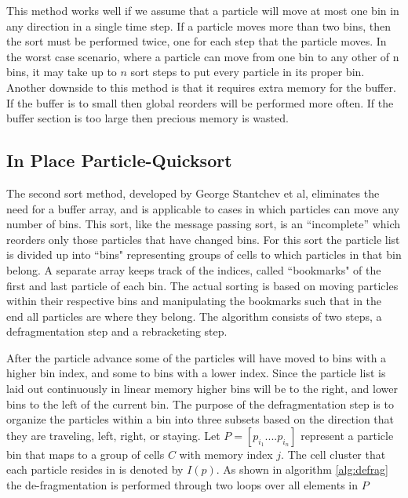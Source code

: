 	This method works well if we assume that a particle will move at most one bin in any direction in a single time step. If a particle moves more than two bins, then the sort must be performed twice, one for each step that the particle moves. In the worst case scenario, where a particle can move from one bin to any other of n bins, it may take up to $n$ sort steps to put every particle in its proper bin. Another downside to this method is that it requires extra memory for the buffer. If the buffer is to small then global reorders will be performed more often. If the buffer section is too large then precious memory is wasted. 

	\subsection{In Place Particle-Quicksort}
	The second sort method, developed by George Stantchev et al, eliminates the need for a buffer array, and is applicable to cases in which particles can move any number of bins. This sort, like the message passing sort, is an ``incomplete'' which reorders only those particles that have changed bins. For this sort the particle list is divided up into ``bins" representing groups of cells to which particles in that bin belong. A separate array keeps track of the indices, called ``bookmarks" of the first and last particle of each bin. The actual sorting is based on moving particles within their respective bins and manipulating the bookmarks such that in the end all particles are where they belong. The algorithm consists of two steps, a defragmentation step and a rebracketing step. 
	
	After the particle advance some of the particles will have moved to bins with a higher bin index, and some to bins with a lower index. Since the particle list is laid out continuously in linear memory higher bins will be to the right, and lower bins to the left of the current bin. The purpose of the defragmentation step is to organize the particles within a bin into three subsets based on the direction that they are traveling, left, right, or staying. Let $P = [p_{i_1}.... p_{i_n}]$ represent a particle bin that maps to a group of cells $C$ with memory index $j$. The cell cluster that each particle resides in is denoted by $I(p)$. As shown in algorithm \ref{alg:defrag} the de-fragmentation is performed through two loops over all elements in $P$

